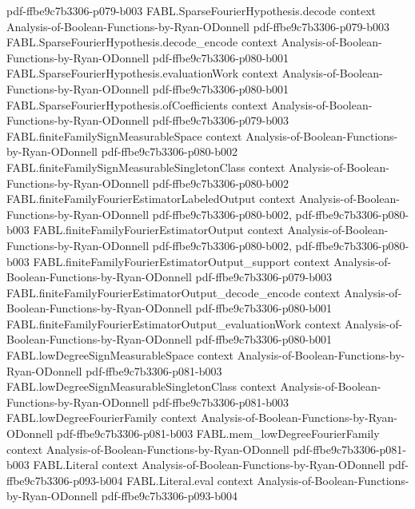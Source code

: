 \begin{theorem}
  {pdf-ffbe9c7b3306-p079-b003}
\proofstep
  {FABL.SparseFourierHypothesis.decode}
  {context}
  {Analysis-of-Boolean-Functions-by-Ryan-ODonnell}
  {pdf-ffbe9c7b3306-p079-b003}
\proofstep
  {FABL.SparseFourierHypothesis.decode_encode}
  {context}
  {Analysis-of-Boolean-Functions-by-Ryan-ODonnell}
  {pdf-ffbe9c7b3306-p080-b001}
\proofstep
  {FABL.SparseFourierHypothesis.evaluationWork}
  {context}
  {Analysis-of-Boolean-Functions-by-Ryan-ODonnell}
  {pdf-ffbe9c7b3306-p080-b001}
\proofstep
  {FABL.SparseFourierHypothesis.ofCoefficients}
  {context}
  {Analysis-of-Boolean-Functions-by-Ryan-ODonnell}
  {pdf-ffbe9c7b3306-p079-b003}
\proofstep
  {FABL.finiteFamilySignMeasurableSpace}
  {context}
  {Analysis-of-Boolean-Functions-by-Ryan-ODonnell}
  {pdf-ffbe9c7b3306-p080-b002}
\proofstep
  {FABL.finiteFamilySignMeasurableSingletonClass}
  {context}
  {Analysis-of-Boolean-Functions-by-Ryan-ODonnell}
  {pdf-ffbe9c7b3306-p080-b002}
\proofstep
  {FABL.finiteFamilyFourierEstimatorLabeledOutput}
  {context}
  {Analysis-of-Boolean-Functions-by-Ryan-ODonnell}
  {pdf-ffbe9c7b3306-p080-b002,
    pdf-ffbe9c7b3306-p080-b003}
\proofstep
  {FABL.finiteFamilyFourierEstimatorOutput}
  {context}
  {Analysis-of-Boolean-Functions-by-Ryan-ODonnell}
  {pdf-ffbe9c7b3306-p080-b002,
    pdf-ffbe9c7b3306-p080-b003}
\proofstep
  {FABL.finiteFamilyFourierEstimatorOutput_support}
  {context}
  {Analysis-of-Boolean-Functions-by-Ryan-ODonnell}
  {pdf-ffbe9c7b3306-p079-b003}
\proofstep
  {FABL.finiteFamilyFourierEstimatorOutput_decode_encode}
  {context}
  {Analysis-of-Boolean-Functions-by-Ryan-ODonnell}
  {pdf-ffbe9c7b3306-p080-b001}
\proofstep
  {FABL.finiteFamilyFourierEstimatorOutput_evaluationWork}
  {context}
  {Analysis-of-Boolean-Functions-by-Ryan-ODonnell}
  {pdf-ffbe9c7b3306-p080-b001}
\proofstep
  {FABL.lowDegreeSignMeasurableSpace}
  {context}
  {Analysis-of-Boolean-Functions-by-Ryan-ODonnell}
  {pdf-ffbe9c7b3306-p081-b003}
\proofstep
  {FABL.lowDegreeSignMeasurableSingletonClass}
  {context}
  {Analysis-of-Boolean-Functions-by-Ryan-ODonnell}
  {pdf-ffbe9c7b3306-p081-b003}
\proofstep
  {FABL.lowDegreeFourierFamily}
  {context}
  {Analysis-of-Boolean-Functions-by-Ryan-ODonnell}
  {pdf-ffbe9c7b3306-p081-b003}
\proofstep
  {FABL.mem_lowDegreeFourierFamily}
  {context}
  {Analysis-of-Boolean-Functions-by-Ryan-ODonnell}
  {pdf-ffbe9c7b3306-p081-b003}
\proofstep
  {FABL.Literal}
  {context}
  {Analysis-of-Boolean-Functions-by-Ryan-ODonnell}
  {pdf-ffbe9c7b3306-p093-b004}
\proofstep
  {FABL.Literal.eval}
  {context}
  {Analysis-of-Boolean-Functions-by-Ryan-ODonnell}
  {pdf-ffbe9c7b3306-p093-b004}

\end{theorem}
